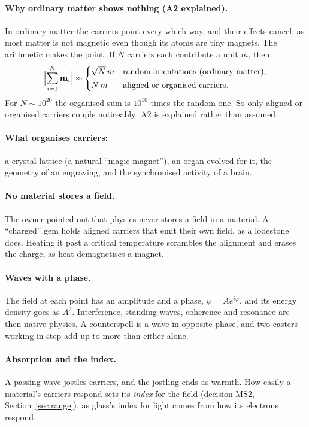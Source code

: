 \documentclass[11pt,a4paper]{article}
\begin{document}
\paragraph{Why ordinary matter shows nothing (A2 explained).} In ordinary matter the carriers point every which way, and their effects cancel, as most matter is not magnetic even though its atoms are tiny magnets. The arithmetic makes the point. If $N$ carriers each contribute a unit $m$, then
\begin{equation}
  \Bigl|\sum_{i=1}^{N} \mathbf m_i\Bigr| \approx
  \begin{cases}
    \sqrt N\, m & \text{random orientations (ordinary matter)},\\[2pt]
    N\, m & \text{aligned or organised carriers}.
  \end{cases}
\end{equation}
For $N \sim 10^{20}$ the organised sum is $10^{10}$ times the random one. So only aligned or organised carriers couple noticeably: A2 is explained rather than assumed.

\paragraph{What organises carriers:} a crystal lattice (a natural ``magic magnet''), an organ evolved for it, the geometry of an engraving, and the synchronised activity of a brain.

\paragraph{No material stores a field.} The owner pointed out that physics never stores a field in a material. A ``charged'' gem holds aligned carriers that emit their own field, as a lodestone does. Heating it past a critical temperature scrambles the alignment and erases the charge, as heat demagnetises a magnet.

\paragraph{Waves with a phase.} The field at each point has an amplitude and a phase, $\psi = A e^{i\varphi}$, and its energy density goes as $A^2$. Interference, standing waves, coherence and resonance are then native physics. A counterspell is a wave in opposite phase, and two casters working in step add up to more than either alone.

\paragraph{Absorption and the index.} A passing wave jostles carriers, and the jostling ends as warmth. How easily a material's carriers respond sets its \emph{index} for the field (decision MS2, Section~\ref{sec:range}), as glass's index for light comes from how its electrons respond.
\end{document}
